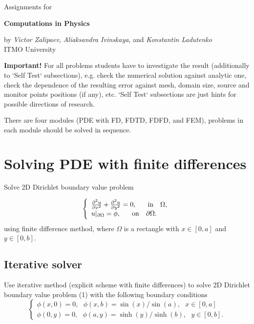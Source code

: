 \documentclass[11pt]{article}
\newcommand{\be}{\begin{equation}}
\newcommand{\ee}{\end{equation}}
\def \be {\begin{equation}}
\def \ee {\end{equation}}
\begin{document}
\thispagestyle{empty}
\begin{center}
		Assignments for 

	\Huge	\textbf{Computations in Physics}
\end{center}
\begin{center}
  by \textit{Victor Zalipaev}, \textit{Aliaksandra Ivinskaya},
  and \textit{Konstantin Ladutenko}\\
  ITMO University
\end{center}

\textbf{Important!} For all problems students have to investigate the result (additionally to `Self Test` subsections), e.g. check the numerical solution against analytic one, check the dependence of the resulting error against mesh, domain size, source and monitor points positions (if any), etc. `Self Test` subsections are just hints for possible directions of research.

There are four modules (PDE with FD, FDTD, FDFD, and FEM), problems in each module should be solved in sequence.  

\section{Solving PDE with finite differences}

Solve 2D Dirichlet boundary value problem

 \be
\left \{\begin{array}{ll}\frac{\partial^2u}{\partial
x^2}+\frac{\partial^2u}{\partial
y^2}=0,~~~~~{\rm in}~~~ \Omega,\\
u|_{\partial\Omega}=\phi,~~~~~{\rm on}~~~\partial\Omega.
\end{array} \right. \label{dp}
 \ee
using finite difference method, where $\Omega$ is a rectangle with
$x\in[0,a]$ and $y\in[0,b]$.

\subsection{Iterative solver}
\label{sec:iterative-solver}

Use iterative method (explicit scheme with finite differences) to solve 2D
Dirichlet boundary value problem (1) with the following boundary
conditions
 \be
 \left \{\begin{array}{ll}
\phi(x,0)=0,~~~\phi(x,b)=\sin(x)/\sin(a),~~~x\in[0,a] \\

\phi(0,y)=0,~~~\phi(a,y)=\sinh(y)/\sinh(b),~~~y\in[0,b].
 \end{array} \right. \label{bc}
 \ee
\end{document}
